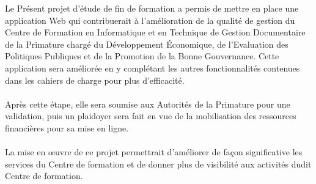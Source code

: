 \conclusion

Le Présent projet d'étude de fin de formation a permis de mettre en place une application Web qui contribuerait à l'amélioration de la qualité de gestion du Centre de Formation en Informatique et en Technique de Gestion Documentaire de la Primature chargé du Développement Économique, de l'Evaluation des Politiques Publiques et de la Promotion de la Bonne Gouvernance. Cette application sera améliorée en y complétant les autres fonctionnalités contenues dans les cahiers de charge pour plus d'efficacité.
\paragraph{}
Après cette étape, elle sera soumise aux Autorités de la Primature pour une validation, puis un plaidoyer sera fait en vue de la mobilisation des ressources financières pour sa mise en ligne. 
\paragraph{}
La mise en œuvre de ce projet permettrait d'améliorer de façon significative les services du Centre de formation et de donner plus de visibilité aux activités dudit Centre de formation.
 

